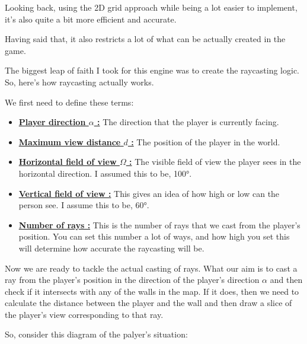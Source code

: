 Looking back, using the 2D grid approach while being a lot easier to implement, it's also quite a bit more efficient and accurate.

Having said that, it also restricts a lot of what can be actually created in the game.


The biggest leap of faith I took for this engine was to create the raycasting logic. So, here's how raycasting actually works.

We first need to define these terms:

\begin{itemize}

    \item \underline{\textbf{Player direction $\alpha$ :}} The direction that the player is currently facing.
		\item \underline{\textbf{Maximum view distance $d$ :}} The position of the player in the world.
    \item \underline{\textbf{Horizontal field of view $\Omega$ :}} The visible field of view the player sees in the horizontal direction. I assumed this to be, 100°.
    \item \underline{\textbf{Vertical field of view :}} This gives an idea of how high or low can the person see. I assume this to be, 60°.
    \item \underline{\textbf{Number of rays :}} This is the number of rays that we cast from the player's position. You can set this number a lot of ways, and how high you set this will determine how accurate the raycasting will be.

\end{itemize}

\pagebreak

Now we are ready to tackle the actual casting of rays. What our aim is to cast a ray from the player's position in the direction of the player's direction $\alpha$ and then check if it intersects with any of the walls in the map. If it does, then we need to calculate the distance between the player and the wall and then draw a slice of the player's view corresponding to that ray.

So, consider this diagram of the palyer's situation:


